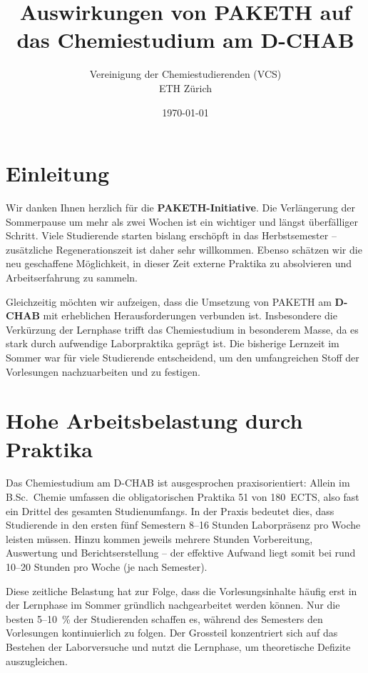 \documentclass[a4paper]{article}
\title{\vspace{-1em}\textbf{Auswirkungen von PAKETH auf das Chemiestudium am D-CHAB}}
\author{Vereinigung der Chemiestudierenden (VCS) \\ ETH Zürich}
\date{\today}
\begin{document}
\thispagestyle{fancy}

\maketitle

\section*{Einleitung}

Wir danken Ihnen herzlich für die \textbf{PAKETH-Initiative}. Die Verlängerung der Sommerpause um mehr als zwei Wochen ist ein wichtiger und längst überfälliger Schritt. Viele Studierende starten bislang erschöpft in das Herbstsemester – zusätzliche Regenerationszeit ist daher sehr willkommen. Ebenso schätzen wir die neu geschaffene Möglichkeit, in dieser Zeit externe Praktika zu absolvieren und Arbeitserfahrung zu sammeln.

Gleichzeitig möchten wir aufzeigen, dass die Umsetzung von PAKETH am \textbf{D-CHAB} mit erheblichen Herausforderungen verbunden ist. Insbesondere die Verkürzung der Lernphase trifft das Chemiestudium in besonderem Masse, da es stark durch aufwendige Laborpraktika geprägt ist. Die bisherige Lernzeit im Sommer war für viele Studierende entscheidend, um den umfangreichen Stoff der Vorlesungen nachzuarbeiten und zu festigen.

\section{Hohe Arbeitsbelastung durch Praktika}

Das Chemiestudium am D-CHAB ist ausgesprochen praxisorientiert: Allein im B.Sc.\ Chemie umfassen die obligatorischen Praktika 51 von 180~ECTS, also fast ein Drittel des gesamten Studienumfangs. In der Praxis bedeutet dies, dass Studierende in den ersten fünf Semestern 8–16 Stunden Laborpräsenz pro Woche leisten müssen. Hinzu kommen jeweils mehrere Stunden Vorbereitung, Auswertung und Berichtserstellung – der effektive Aufwand liegt somit bei rund 10–20 Stunden pro Woche (je nach Semester).

Diese zeitliche Belastung hat zur Folge, dass die Vorlesungsinhalte häufig erst in der Lernphase im Sommer gründlich nachgearbeitet werden können. Nur die besten 5–10~\% der Studierenden schaffen es, während des Semesters den Vorlesungen kontinuierlich zu folgen. Der Grossteil konzentriert sich auf das Bestehen der Laborversuche und nutzt die Lernphase, um theoretische Defizite auszugleichen.
\end{document}

